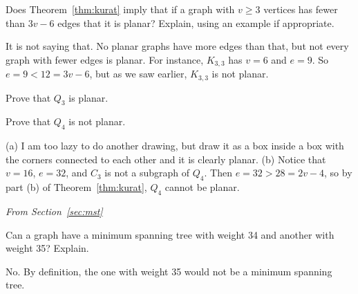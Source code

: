 
\begin{requ}
Does Theorem~\ref{thm:kurat} imply that if a graph with $v\geq 3$ vertices has fewer
than $3v-6$ edges that it is planar? Explain, using an example if appropriate.
\begin{requanswer}
It is not saying that. No planar graphs have more edges than that, but not every graph with fewer edges is planar.
For instance, $K_{3,3}$ has $v=6$ and $e=9$. So $e=9<12=3v-6$, but as we saw earlier, $K_{3,3}$ is not planar. 
\end{requanswer}
\end{requ}

\begin{requ}
\begin{lenum}
\item Prove that $Q_3$ is planar.
\item Prove that $Q_4$ is not planar.
\end{lenum}
\begin{requanswer}
(a) I am too lazy to do another drawing, but draw it as a box inside a box with the corners connected to each other and it is clearly planar.
(b) Notice that $v=16$, $e=32$, and $C_3$ is not a subgraph of $Q_4$. Then $e=32>28=2v-4$, so by part (b) of
Theorem~\ref{thm:kurat}, $Q_4$ cannot be planar.
\end{requanswer}
\end{requ}


\noindent
{\em From Section~\ref{sec:mst}}

\begin{requ}
Can a graph have a minimum spanning tree with weight 34 
and another with weight 35? Explain.
\begin{requanswer}
No. By definition, the one with weight 35 would not be a minimum spanning tree.
\end{requanswer}
\end{requ}

